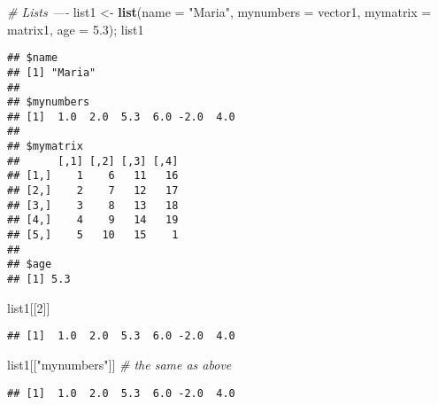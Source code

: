 \documentclass[]{article}
\newenvironment{Shaded}{\begin{snugshade}}{\end{snugshade}}
\newcommand{\KeywordTok}[1]{\textcolor[rgb]{0.13,0.29,0.53}{\textbf{#1}}}
\newcommand{\DataTypeTok}[1]{\textcolor[rgb]{0.13,0.29,0.53}{#1}}
\newcommand{\DecValTok}[1]{\textcolor[rgb]{0.00,0.00,0.81}{#1}}
\newcommand{\FloatTok}[1]{\textcolor[rgb]{0.00,0.00,0.81}{#1}}
\newcommand{\StringTok}[1]{\textcolor[rgb]{0.31,0.60,0.02}{#1}}
\newcommand{\CommentTok}[1]{\textcolor[rgb]{0.56,0.35,0.01}{\textit{#1}}}
\newcommand{\NormalTok}[1]{#1}
\begin{document}
\begin{Shaded}
\begin{Highlighting}[]
\CommentTok{# Lists ---- }
\NormalTok{list1 <-}\StringTok{ }\KeywordTok{list}\NormalTok{(}\DataTypeTok{name =} \StringTok{"Maria"}\NormalTok{, }\DataTypeTok{mynumbers =}\NormalTok{ vector1, }\DataTypeTok{mymatrix =}\NormalTok{ matrix1, }\DataTypeTok{age =} \FloatTok{5.3}\NormalTok{); list1}
\end{Highlighting}
\end{Shaded}

\begin{verbatim}
## $name
## [1] "Maria"
## 
## $mynumbers
## [1]  1.0  2.0  5.3  6.0 -2.0  4.0
## 
## $mymatrix
##      [,1] [,2] [,3] [,4]
## [1,]    1    6   11   16
## [2,]    2    7   12   17
## [3,]    3    8   13   18
## [4,]    4    9   14   19
## [5,]    5   10   15    1
## 
## $age
## [1] 5.3
\end{verbatim}

\begin{Shaded}
\begin{Highlighting}[]
\NormalTok{list1[[}\DecValTok{2}\NormalTok{]]}
\end{Highlighting}
\end{Shaded}

\begin{verbatim}
## [1]  1.0  2.0  5.3  6.0 -2.0  4.0
\end{verbatim}

\begin{Shaded}
\begin{Highlighting}[]
\NormalTok{list1[[}\StringTok{"mynumbers"}\NormalTok{]] }\CommentTok{# the same as above}
\end{Highlighting}
\end{Shaded}

\begin{verbatim}
## [1]  1.0  2.0  5.3  6.0 -2.0  4.0
\end{verbatim}
\end{document}
